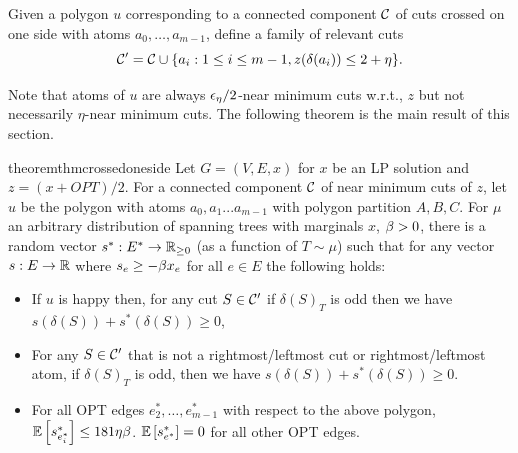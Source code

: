 \begin{definition}
Given a polygon $u$ corresponding to a connected component ${\cal C}$ of cuts crossed on one side with atoms $a_0,\dots,a_{m-1}$, define a family of relevant cuts
$${\cal C}'={\cal C}\cup \{a_i:  1\leq i\leq m-1, z(\delta(a_i))\leq 2+\eta\}.$$
\end{definition}
Note that atoms of $u$ are always ${\epsilon}_\eta/2$-near minimum cuts w.r.t., $z$ but not necessarily $\eta$-near minimum cuts.
The following theorem is the main result of this section.
\begin{restatable}{theorem}{thmcrossedoneside}\label{thm:crossed-one-side}
	Let $G=(V,E,x)$ for $x$ be an LP solution and  $z=(x+OPT)/2$.
	For a connected component ${\cal C}$ of near minimum cuts of $z$, let $u$ be the polygon with atoms $a_0,a_1...a_{m-1}$ with polygon partition $A,B,C$. 
	For $\mu$ an arbitrary distribution of spanning trees with marginals $x$, $\beta > 0$, there is a random vector $s^*:E^*\to\mathbb{R}_{\geq 0}$ (as a function of $T\sim\mu$) such that for any vector $s:E\to\mathbb{R}$ where $s_e\geq -\beta x_e$  for all $e\in E$ the following holds:
	
	\begin{itemize}
		\item If $u$ is happy then, for any cut $S\in {\cal C}'$ if  $\delta(S)_T$ is odd then we have $s(\delta(S))+s^*(\delta(S))\geq 0$,
		\item For any $S\in {\cal C}'$ that is not a rightmost/leftmost cut or rightmost/leftmost atom, if $\delta(S)_T$ is odd, then we have 
		$s(\delta(S))+s^*(\delta(S))\geq 0$. 
		\item For all OPT edges $e^*_2,\dots,e^*_{m-1}$ with respect to the above polygon, ${\mathbb{E}}\left[s^*_{e^*_i}\right]\leq 181\eta \beta$. ${\mathbb{E}}\left[s^*_{e^*}\right] = 0$ for all other OPT edges.
	\end{itemize}
\end{restatable} 


